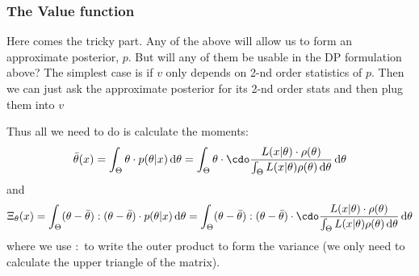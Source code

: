 \documentclass{article}
\begin{document}
% 
% 
% 
% 
% 





\subsubsection{The Value function}
Here comes the tricky part. Any of the above will allow us to form an
approximate posterior, $p$. But will any of them be usable in the DP formulation
above? The simplest case is if $v$ only depends on 2-nd order
statistics of $p$. Then we can just ask  the approximate posterior for its 2-nd order stats
and then plug them into $v$

Thus all we need to do is calculate the moments:
$$\bar \th (x) = \int_\Th \th \cdot p(\th|x) \intd{\th} 
= \int_\Th \th  \cdot \cdo \frac{L(x|\th) \cdot \rho(\th) }{\int_\Theta L(x|\th)
\rho(\th) \intd{\th}} \intd{\th}  $$
and
$$\Xi_\th(x) = \int_\Th  (\th - \bar \th) : (\th - \bar \th)\cdot p(\th|x)
\intd{\th} 
= \int_\Th  (\th - \bar \th) : (\th - \bar \th)\cdot \cdo \frac{L(x|\th) \cdot
\rho(\th) }{\int_\Theta L(x|\th) \rho(\th) \intd{\th}} \intd{\th} 
$$
where we use $:$ to write the outer product to form the variance (we only need
to calculate the upper triangle of the matrix).
\end{document}
